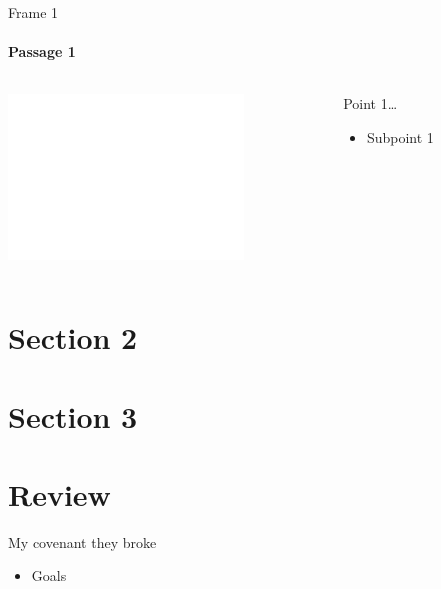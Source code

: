 \begin{frame}{Frame 1}
\framesubtitle{Passage 1}

\begin{columns}[c]
\begin{column}{0.6\textwidth}
	\includegraphics[draft, width=\columnwidth]{figures/dummy.png}
\end{column}
\begin{column}{0.4\textwidth}
	Point 1\ldots
	\begin{itemize}
		\item Subpoint 1
	\end{itemize}
\end{column}
\end{columns}

\end{frame}

\section{Section 2}

\section{Section 3}

\section{Review}

\begin{frame}{My covenant they broke}
	\begin{itemize}
		\item Goals
	\end{itemize}
	
\end{frame}
